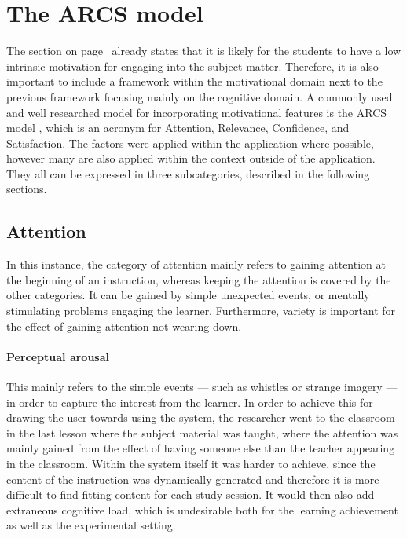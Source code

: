     \section{The ARCS model}

The  section on page~\pageref{sec:learneranalysis} already states that it is likely for the students to have a low intrinsic motivation for engaging into the subject matter. Therefore, it is also important to include a framework within the motivational domain next to the previous framework focusing mainly on the cognitive domain. A commonly used and well researched model for incorporating motivational features is the ARCS model \cite{arcs}, which is an acronym for Attention, Relevance, Confidence, and Satisfaction. The factors were applied within the application where possible, however many are also applied within the context outside of the application. They all can be expressed in three subcategories, described in the following sections.

        \subsection{Attention}

In this instance, the category of attention mainly refers to gaining attention at the beginning of an instruction, whereas keeping the attention is covered by the other categories. It can be gained by simple unexpected events, or mentally stimulating problems engaging the learner. Furthermore, variety is important for the effect of gaining attention not wearing down.

\paragraph{Perceptual arousal} This mainly refers to the simple events --- such as whistles or strange imagery --- in order to capture the interest from the learner. In order to achieve this for drawing the user towards using the system, the researcher went to the classroom in the last lesson where the subject material was taught, where the attention was mainly gained from the effect of having someone else than the teacher appearing in the classroom. Within the system itself it was harder to achieve, since the content of the instruction was dynamically generated and therefore it is more difficult to find fitting content for each study session. It would then also add extraneous cognitive load, which is undesirable both for the learning achievement as well as the experimental setting.


